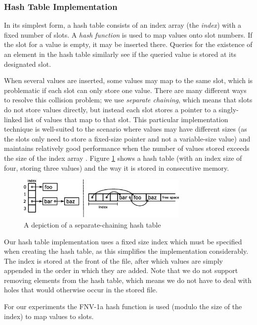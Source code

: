 \documentclass{acm_proc_article-sp}
\begin{document}
\subsubsection{Hash Table Implementation}
In its simplest form, a hash table consists of an
index array (the \emph{index}) with a fixed number of slots. A \emph{hash
function} is used to map values onto slot numbers. If the slot for a value
is empty, it may be inserted there. Queries for the existence of an element in
the hash table similarly see if the queried value is stored at its designated
slot.

When several values are inserted, some values may map to the same slot,
which is problematic if each slot can only store one value. There
are many different ways to resolve this collision problem; we use
\emph{separate chaining}, which means that slots do not store values directly,
but instead each slot stores a pointer to a singly-linked list of values that
map to that slot. This particular implementation technique is well-suited to
the scenario where values may have different sizes (as the slots only need to
store a fixed-size pointer and not a variable-size value) and maintains
relatively good performance when the number of values stored exceeds the size
of the index array \cite{sedgewick1998ac}. Figure \ref{fig-hash-table} shows a
hash table (with an index size of four, storing three values) and the way it
is stored in consecutive memory.

\begin{figure}[t]
\centering
\includegraphics[width=83mm]{hash-table}
\caption{A depiction of a separate-chaining hash table}
\label{fig-hash-table}
\end{figure}

Our hash table implementation uses a fixed size index which must be specified
when creating the hash table, as this simplifies the implementation
considerably. The index is stored at the front of the file, after which values
are simply appended in the order in which they are added. Note that we do not
support removing elements from the hash table, which means we do not have to
deal with holes that would otherwise occur in the stored file.

For our
experiments the FNV-1a hash function \cite{noll2004fnv} is used (modulo the
size of the index) to map values to slots.
\end{document}
